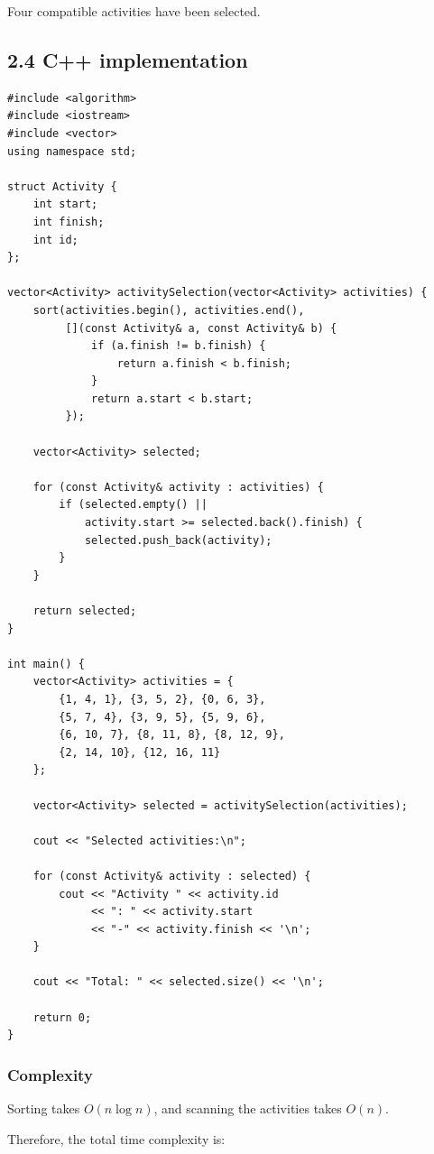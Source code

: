 Four compatible activities have been selected.

\subsection{2.4 C++ implementation}

\begin{lstlisting}[style=cppstyle]
#include <algorithm>
#include <iostream>
#include <vector>
using namespace std;

struct Activity {
    int start;
    int finish;
    int id;
};

vector<Activity> activitySelection(vector<Activity> activities) {
    sort(activities.begin(), activities.end(),
         [](const Activity& a, const Activity& b) {
             if (a.finish != b.finish) {
                 return a.finish < b.finish;
             }
             return a.start < b.start;
         });

    vector<Activity> selected;

    for (const Activity& activity : activities) {
        if (selected.empty() ||
            activity.start >= selected.back().finish) {
            selected.push_back(activity);
        }
    }

    return selected;
}

int main() {
    vector<Activity> activities = {
        {1, 4, 1}, {3, 5, 2}, {0, 6, 3},
        {5, 7, 4}, {3, 9, 5}, {5, 9, 6},
        {6, 10, 7}, {8, 11, 8}, {8, 12, 9},
        {2, 14, 10}, {12, 16, 11}
    };

    vector<Activity> selected = activitySelection(activities);

    cout << "Selected activities:\n";

    for (const Activity& activity : selected) {
        cout << "Activity " << activity.id
             << ": " << activity.start
             << "-" << activity.finish << '\n';
    }

    cout << "Total: " << selected.size() << '\n';

    return 0;
}
\end{lstlisting}

\subsubsection{Complexity}

Sorting takes $O(n\log n)$, and scanning the activities takes $O(n)$.

Therefore, the total time complexity is:


